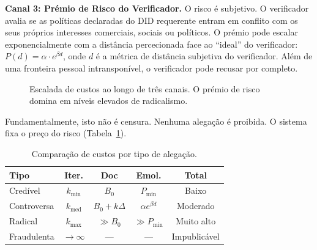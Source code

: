 \documentclass[11pt,a4paper,twocolumn]{article}
\begin{document}
\textbf{Canal 3: Prémio de Risco do Verificador.} O risco é subjetivo. O verificador avalia se as políticas declaradas do DID requerente entram em conflito com os seus próprios interesses comerciais, sociais ou políticos. O prémio pode escalar exponencialmente com a distância percecionada face ao ``ideal'' do verificador: $P(d) = \alpha \cdot e^{\beta d}$, onde $d$ é a métrica de distância subjetiva do verificador. Além de uma fronteira pessoal intransponível, o verificador pode recusar por completo.

\begin{figure}[ht]
\centering
{}
\caption{Escalada de custos ao longo de três canais. O prémio de risco domina em níveis elevados de radicalismo.}
\label{fig:radicalism}
\end{figure}

Fundamentalmente, isto não é censura. Nenhuma alegação é proibida. O sistema fixa o preço do risco (Tabela~\ref{tab:costs}).

\begin{table}[ht]
\centering
\caption{Comparação de custos por tipo de alegação.}
\label{tab:costs}
\footnotesize
\begin{tabular}{@{}lcccc@{}}
\toprule
\textbf{Tipo} & \textbf{Iter.} & \textbf{Doc} & \textbf{Emol.} & \textbf{Total} \\
\midrule
Credível & $k_{\min}$ & $B_0$ & $P_{\min}$ & Baixo \\
Controversa & $k_{\text{med}}$ & $B_0{+}k\Delta$ & $\alpha e^{\beta d}$ & Moderado \\
Radical & $k_{\max}$ & $\gg B_0$ & $\gg P_{\min}$ & Muito alto \\
Fraudulenta & $\to\infty$ & --- & --- & Impublicável \\
\bottomrule
\end{tabular}
\end{table}
\end{document}
